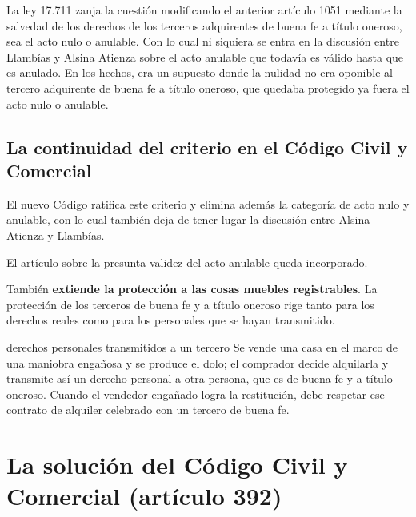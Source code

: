 \documentclass[12pt,oneside]{book}
\begin{document}
La ley 17.711 zanja la cuestión modificando el anterior artículo 1051 mediante la salvedad de los derechos de los terceros adquirentes de buena fe a título oneroso, sea el acto nulo o anulable. Con lo cual ni siquiera se entra en la discusión entre Llambías y Alsina Atienza sobre el acto anulable que todavía es válido hasta que es anulado. En los hechos, era un supuesto donde la nulidad no era oponible al tercero adquirente de buena fe a título oneroso, que quedaba protegido ya fuera el acto nulo o anulable.

\subsection*{La continuidad del criterio en el Código Civil y Comercial}

El nuevo Código ratifica este criterio y elimina además la categoría de acto nulo y anulable, con lo cual también deja de tener lugar la discusión entre Alsina Atienza y Llambías.

El artículo sobre la presunta validez del acto anulable queda incorporado.

También \textbf{extiende la protección a las cosas muebles registrables}. La protección de los terceros de buena fe y a título oneroso rige tanto para los derechos reales como para los personales que se hayan transmitido.

\begin{example}{derechos personales transmitidos a un tercero}
Se vende una casa en el marco de una maniobra engañosa y se produce el dolo; el comprador decide alquilarla y transmite así un derecho personal a otra persona, que es de buena fe y a título oneroso. Cuando el vendedor engañado logra la restitución, debe respetar ese contrato de alquiler celebrado con un tercero de buena fe.
\end{example}

\section{La solución del Código Civil y Comercial (artículo 392)}
\label{sec:art392}
\end{document}
